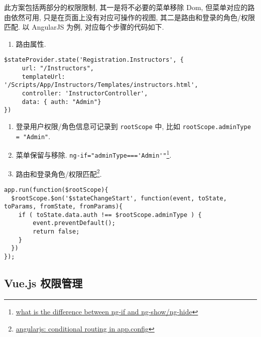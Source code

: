 此方案包括两部分的权限限制, 其一是将不必要的菜单移除 Dom,
但菜单对应的路由依然可用, 只是在页面上没有对应可操作的视图,
其二是路由和登录的角色/权限匹配. 以 AngularJS 为例,
对应每个步骤的代码如下.

\begin{enumerate}
\def\labelenumi{\arabic{enumi}.}
\tightlist
\item
  路由属性.
\end{enumerate}

\begin{lstlisting}
$stateProvider.state('Registration.Instructors', {
     url: "/Instructors",
     templateUrl: '/Scripts/App/Instructors/Templates/instructors.html',
     controller: 'InstructorController',
     data: { auth: "Admin"}
})
\end{lstlisting}

\begin{enumerate}
\def\labelenumi{\arabic{enumi}.}
\setcounter{enumi}{1}
\tightlist
\item
  登录用户权限/角色信息可记录到 \lstinline!rootScope! 中, 比如
  \lstinline!rootScope.adminType = "Admin"!.
\item
  菜单保留与移除. \lstinline!ng-if="adminType==='Admin'"!\footnote{\href{http://stackoverflow.com/questions/19177732/what-is-the-difference-between-ng-if-and-ng-show-ng-hide}{what
    is the difference between ng-if and ng-show/ng-hide}}.
\item
  路由和登录角色/权限匹配\footnote{\href{http://stackoverflow.com/questions/20978248/angularjs-conditional-routing-in-app-config}{angularjs:
    conditional routing in app.config}}.
\end{enumerate}

\begin{lstlisting}
app.run(function($rootScope){
  $rootScope.$on('$stateChangeStart', function(event, toState, toParams, fromState, fromParams){
    if ( toState.data.auth !== $rootScope.adminType ) {
        event.preventDefault();
        return false;
    }
  })
});
\end{lstlisting}

\subsection{Vue.js 权限管理}\label{vue.js-ux6743ux9650ux7ba1ux7406}

